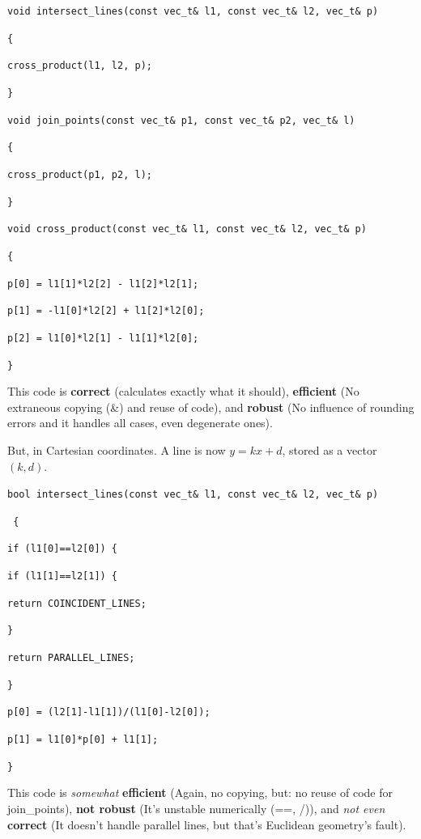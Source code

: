\texttt{void intersect\_lines(const vec\_t\& l1, const vec\_t\& l2, vec\_t\& p)}

\texttt{\{}

\quad\texttt{cross\_product(l1, l2, p);}

\texttt{\}}

\texttt{void join\_points(const vec\_t\& p1, const vec\_t\& p2, vec\_t\& l)}

\texttt{\{}

\quad\texttt{cross\_product(p1, p2, l);}

\texttt{\}}

\texttt{void cross\_product(const vec\_t\& l1, const vec\_t\& l2, vec\_t\& p)}

\texttt{\{}

\quad\texttt{p[0] = l1[1]*l2[2] - l1[2]*l2[1];}

\quad\texttt{p[1] = -l1[0]*l2[2] + l1[2]*l2[0];}

\quad\texttt{p[2] = l1[0]*l2[1] - l1[1]*l2[0];}

\texttt{\}}

This code is \textbf{correct} (calculates exactly what it should), \textbf{efficient} (No extraneous copying (\&) and reuse of code), and \textbf{robust} (No influence of rounding errors and it handles all cases, even degenerate ones).


But, in Cartesian coordinates. A line is now $y = kx + d$, stored as a vector $(k , d)$.

\texttt{bool intersect\_lines(const vec\_t\& l1, const vec\_t\& l2, vec\_t\& p)}

\texttt{ \{}

\texttt{if (l1[0]==l2[0]) \{}

\texttt{if (l1[1]==l2[1]) \{}

\texttt{return COINCIDENT\_LINES;}

\texttt{\}}

\texttt{return PARALLEL\_LINES;}

\texttt{\}}

\texttt{p[0] = (l2[1]-l1[1])/(l1[0]-l2[0]);}

\texttt{p[1] = l1[0]*p[0] + l1[1];}

\texttt{\}}

This code is \textit{somewhat} \textbf{efficient} (Again, no copying, but: no reuse of code for join\_points), \textbf{not robust} (It's unstable numerically (==, /)), and \textit{not even} \textbf{correct} (It doesn't handle parallel lines, but that's Euclidean geometry's fault).


